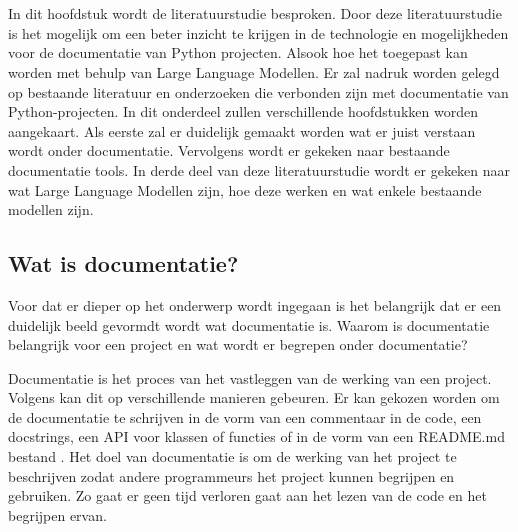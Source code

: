 \chapter{}%
\label{ch:stand-van-zaken}



In dit hoofdstuk wordt de literatuurstudie besproken. Door deze literatuurstudie is het mogelijk om een beter inzicht te krijgen in de technologie en mogelijkheden voor de documentatie van Python projecten. 
Alsook hoe het toegepast kan worden met behulp van Large Language Modellen. Er
zal nadruk worden gelegd op bestaande literatuur en onderzoeken die verbonden
zijn met documentatie van Python-projecten. In dit onderdeel zullen verschillende hoofdstukken worden aangekaart. 
Als eerste zal er duidelijk gemaakt worden wat er juist verstaan wordt onder documentatie. 
Vervolgens wordt er gekeken naar bestaande documentatie tools.
In derde deel van deze literatuurstudie wordt er gekeken naar wat Large Language Modellen zijn, hoe deze werken en wat enkele bestaande modellen zijn.

\section{Wat is documentatie?}
\label{sec:wat-is-documentatie}

Voor dat er dieper op het onderwerp wordt ingegaan is het belangrijk dat er een duidelijk beeld gevormdt wordt wat documentatie is. 
Waarom is documentatie belangrijk voor een project en wat wordt er begrepen onder documentatie? 

Documentatie is het proces van het vastleggen van de werking van een project.
Volgens \textcite{CodeQuality2024} kan dit op verschillende manieren gebeuren. 
Er kan gekozen worden om de documentatie te schrijven in de vorm van een commentaar in de code, een docstrings, een API voor klassen of functies of in de vorm van een README.md bestand \autocite{CodeQuality2024}.
Het doel van documentatie is om de werking van het project te beschrijven zodat andere programmeurs het project kunnen begrijpen en gebruiken.
Zo gaat er geen tijd verloren gaat aan het lezen van de code en het begrijpen ervan.

